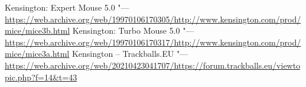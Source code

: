 \documentclass[11pt, a4paper]{article}
\begin{document}
\begin{thebibliography}{9}

 Kensington: Expert Mouse 5.0 "--- \url{https://web.archive.org/web/19970106170305/http://www.kensington.com/prod/mice/mice3b.html}
 Kensington: Turbo Mouse 5.0 "--- \url{https://web.archive.org/web/19970106170317/http://www.kensington.com/prod/mice/mice3a.html}
 Kensington -- Trackballs.EU "--- \url{https://web.archive.org/web/20210423041707/https://forum.trackballs.eu/viewtopic.php?f=14&t=43}
\end{thebibliography}
\end{document}
